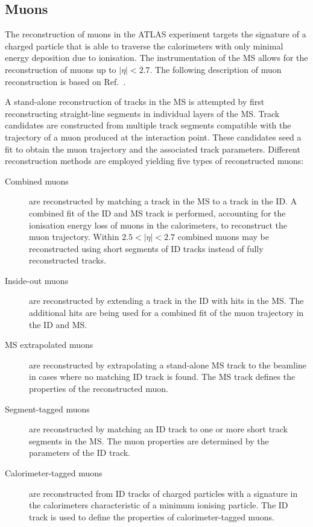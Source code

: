 \subsection{Muons}%
\label{sec:muon_rec}

The reconstruction of muons in the ATLAS experiment targets the signature of a
charged particle that is able to traverse the calorimeters with only minimal
energy deposition due to ionisation. The instrumentation of the MS allows for
the reconstruction of muons up to $|\eta| < 2.7$. The following description of
muon reconstruction is based on Ref.~\cite{MUON-2018-03}.

A stand-alone reconstruction of tracks in the MS is attempted by first
reconstructing straight-line segments in individual layers of the MS. Track
candidates are constructed from multiple track segments compatible with the
trajectory of a muon produced at the interaction point. These candidates seed a
fit to obtain the muon trajectory and the associated track parameters. Different
reconstruction methods are employed yielding five types of reconstructed muons:
\begin{description}

\item[Combined muons] are reconstructed by matching a track in the MS to a track
  in the ID. A combined fit of the ID and MS track is performed, accounting for
  the ionisation energy loss of muons in the calorimeters, to reconstruct the
  muon trajectory. Within $2.5 < |\eta| < 2.7$ combined muons may be
  reconstructed using short segments of ID tracks instead of fully reconstructed
  tracks.

\item[Inside-out muons] are reconstructed by extending a track in the ID with
  hits in the MS. The additional hits are being used for a combined fit of the
  muon trajectory in the ID and MS.

\item[MS extrapolated muons] are reconstructed by extrapolating a stand-alone MS
  track to the beamline in cases where no matching ID track is found. The MS
  track defines the properties of the reconstructed muon. %

\item[Segment-tagged muons] are reconstructed by matching an ID track to one or
  more short track segments in the MS. The muon properties are determined by the
  parameters of the ID track.

\item[Calorimeter-tagged muons] are reconstructed from ID tracks of charged
  particles with a signature in the calorimeters characteristic of a minimum
  ionising particle. The ID track is used to define the properties of
  calorimeter-tagged muons.

\end{description}
